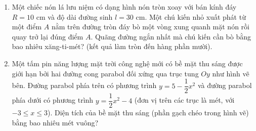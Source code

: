 \documentclass[12pt,a4paper]{article}
\begin{document}
\begin{enumerate}[label=\textbf{Câu \arabic*:}, leftmargin=*]

\item Một chiếc nón lá lưu niệm có dạng hình nón tròn xoay với bán kính đáy $R = 10\text{ cm}$ và độ dài đường sinh $l = 30\text{ cm}$. Một chú kiến nhỏ xuất phát từ một điểm $A$ nằm trên đường tròn đáy bò một vòng xung quanh mặt nón rồi quay trở lại đúng điểm $A$. Quãng đường ngắn nhất mà chú kiến cần bò bằng bao nhiêu xăng-ti-mét? (kết quả làm tròn đến hàng phần mười).

\item \begin{minipage}[t]{0.55\linewidth}
Một tấm pin năng lượng mặt trời công nghệ mới có bề mặt thu sáng được giới hạn bởi hai đường cong parabol đối xứng qua trục tung $Oy$ như hình vẽ bên. Đường parabol phía trên có phương trình $y = 5 - \dfrac{1}{2}x^2$ và đường parabol phía dưới có phương trình $y = \dfrac{1}{2}x^2 - 4$ (đơn vị trên các trục là mét, với $-3 \le x \le 3$). Diện tích của bề mặt thu sáng (phần gạch chéo trong hình vẽ) bằng bao nhiêu mét vuông?
\end{minipage}\hfill
\begin{minipage}[t]{0.42\linewidth}
\vspace{-0.4\baselineskip}
\centering
{}
\end{minipage}


\end{enumerate}
\end{document}
